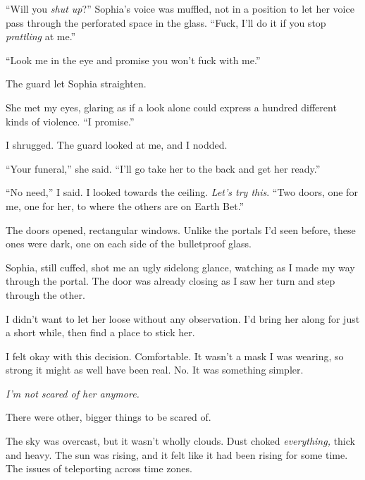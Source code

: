``Will you\emph{ shut up}?''  Sophia's voice was muffled, not in a position to let her voice pass through the perforated space in the glass.  ``Fuck, I'll do it if you stop \emph{prattling} at me.''



``Look me in the eye and promise you won't fuck with me.''



The guard let Sophia straighten.



She met my eyes, glaring as if a look alone could express a hundred different kinds of violence.  ``I promise.''



I shrugged.  The guard looked at me, and I nodded.



``Your funeral,'' she said.  ``I'll go take her to the back and get her ready.''



``No need,'' I said.  I looked towards the ceiling.  \emph{Let's try this}.  ``Two doors, one for me, one for her, to where the others are on Earth Bet.''



The doors opened, rectangular windows.  Unlike the portals I'd seen before, these ones were dark, one on each side of the bulletproof glass.



Sophia, still cuffed, shot me an ugly sidelong glance, watching as I made my way through the portal.  The door was already closing as I saw her turn and step through the other.



I didn't want to let her loose without any observation.  I'd bring her along for just a short while, then find a place to stick her.



I felt okay with this decision.  Comfortable.  It wasn't a mask I was wearing, so strong it might as well have been real.  No.  It was something simpler.



\emph{I'm not scared of her anymore.}



\blacksquare



There were other, bigger things to be scared of.



The sky was overcast, but it wasn't wholly clouds.  Dust choked \emph{everything,} thick and heavy.  The sun was rising, and it felt like it had been rising for some time.  The issues of teleporting across time zones.



